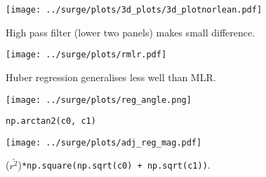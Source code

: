 \begin{figure}
\centering
\texttt{[image: ../surge/plots/3d\_plots/3d\_plotnorlean.pdf]}
 \caption{High pass filter (lower two panels) makes small difference.}
 \label{fig:tau-tau-r-no}
\end{figure}


\begin{figure*}
\centering
 \hspace{-40pt} \texttt{[image: ../surge/plots/rmlr.pdf]}
  \vspace{-15pt}
 \caption{Huber regression generalises less well than MLR.}
 \label{fig:tau-tau-resp}
 \hspace{-40pt} \texttt{[image: ../surge/plots/reg\_angle.png]}
  \vspace{-15pt}
 \caption{\texttt{np.arctan2(c0, c1)}}
  \label{fig:tau-tau-angle}
  \hspace{-40pt} \texttt{[image: ../surge/plots/adj\_reg\_mag.pdf]}
   \vspace{-15pt}
  \caption{($\bar{r^2}$)\texttt{*np.square(np.sqrt(c0) + np.sqrt(c1))}. }
   \label{fig:tau-tau-responsiveness}
\end{figure*}

